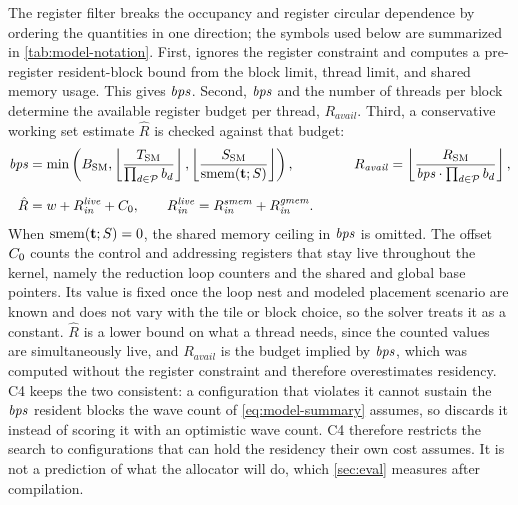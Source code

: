 The register filter breaks the occupancy and register circular dependence by ordering the quantities in one direction; the symbols used below are summarized in \autoref{tab:model-notation}. First, \name ignores the register constraint and computes a pre-register resident-block bound from the block limit, thread limit, and shared memory usage. This gives \(\mathit{bps}\). Second, \(\mathit{bps}\) and the number of threads per block determine the available register budget per thread, \(R_{\mathit{avail}}\). Third, a conservative working set estimate \(\hat{R}\) is checked against that budget:
\begingroup
\renewcommand{\arraystretch}{1.12}
\begin{equation}
\begin{aligned}
\mathit{bps}
&= \min\left(
   B_{\mathrm{SM}},
   \left\lfloor \dfrac{T_{\mathrm{SM}}}{\prod_{d\in\mathcal{P}} b_d} \right\rfloor,
   \left\lfloor
   \dfrac{S_{\mathrm{SM}}}{\operatorname{smem}(\mathbf{t};S)}
   \right\rfloor
   \right),
&\qquad
R_{\mathit{avail}}
&= \left\lfloor
   \dfrac{R_{\mathrm{SM}}}{\mathit{bps} \cdot \prod_{d\in\mathcal{P}} b_d}
   \right\rfloor,\\[1.5ex]
\hat{R}
&= w + R^{\mathit{live}}_{\mathit{in}} + C_0,
\qquad
R^{\mathit{live}}_{\mathit{in}}
= R^{\mathit{smem}}_{\mathit{in}} + R^{\mathit{gmem}}_{\mathit{in}}.
\end{aligned}
\label{eq:resident-blocks}
\end{equation}
\endgroup
When \(\operatorname{smem}(\mathbf{t};S)=0\), the shared memory ceiling in \(\mathit{bps}\) is omitted. The offset \(C_0\) counts the control and addressing registers that stay live throughout the kernel, namely the reduction loop counters and the shared and global base pointers. Its value is fixed once the loop nest and modeled placement scenario are known and does not vary with the tile or block choice, so the solver treats it as a constant. \(\hat R\) is a lower bound on what a thread needs, since the counted values are simultaneously live, and \(R_{\mathit{avail}}\) is the budget implied by \(\mathit{bps}\), which was computed without the register constraint and therefore overestimates residency. C4 keeps the two consistent: a configuration that violates it cannot sustain the \(\mathit{bps}\) resident blocks the wave count of \autoref{eq:model-summary} assumes, so \name discards it instead of scoring it with an optimistic wave count. C4 therefore restricts the search to configurations that can hold the residency their own cost assumes. It is not a prediction of what the allocator will do, which \autoref{sec:eval} measures after compilation.

